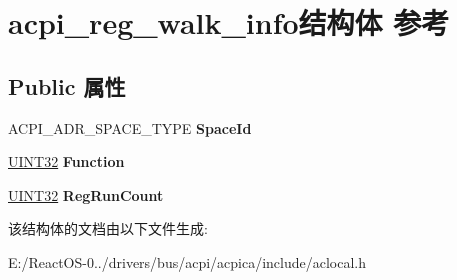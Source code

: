 \hypertarget{structacpi__reg__walk__info}{}\section{acpi\+\_\+reg\+\_\+walk\+\_\+info结构体 参考}
\label{structacpi__reg__walk__info}
\subsection*{Public 属性}
\begin{DoxyCompactItemize}
\item 
\mbox{\label{structacpi__reg__walk__info_ac7bd8bfb9fbad467447e3e2750ffe614}} 
A\+C\+P\+I\+\_\+\+A\+D\+R\+\_\+\+S\+P\+A\+C\+E\+\_\+\+T\+Y\+PE {\bfseries Space\+Id}
\item 
\mbox{\label{structacpi__reg__walk__info_a4d0053d07bd325b7b44c7b848749195b}} 
\hyperlink{_processor_bind_8h_ae1e6edbbc26d6fbc71a90190d0266018}{U\+I\+N\+T32} {\bfseries Function}
\item 
\mbox{\label{structacpi__reg__walk__info_a6caa3463c3e9b57a013f3ae527736801}} 
\hyperlink{_processor_bind_8h_ae1e6edbbc26d6fbc71a90190d0266018}{U\+I\+N\+T32} {\bfseries Reg\+Run\+Count}
\end{DoxyCompactItemize}


该结构体的文档由以下文件生成\+:\begin{DoxyCompactItemize}
\item 
E\+:/\+React\+O\+S-\/0../drivers/bus/acpi/acpica/include/aclocal.\+h\end{DoxyCompactItemize}
